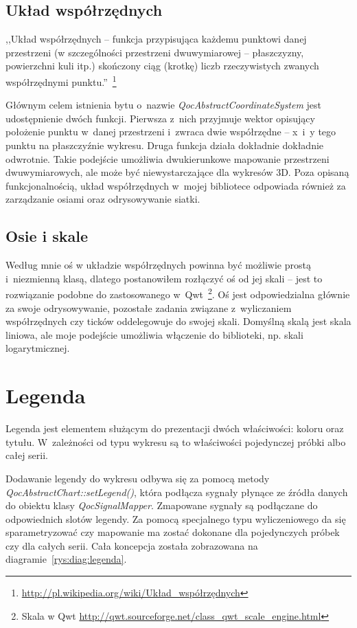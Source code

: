 \subsection{Układ współrzędnych}
,,Układ współrzędnych -- funkcja przypisująca każdemu punktowi danej przestrzeni (w szczególności przestrzeni dwuwymiarowej -- płaszczyzny, powierzchni kuli itp.) skończony ciąg (krotkę) liczb rzeczywistych zwanych współrzędnymi punktu.''~\footnote{\url{http://pl.wikipedia.org/wiki/Układ\_współrzędnych}}

Głównym celem istnienia bytu o~nazwie \textit{QocAbstractCoordinateSystem} jest udostępnienie dwóch funkcji. Pierwsza z~nich przyjmuje wektor opisujący położenie punktu w~danej przestrzeni i~zwraca dwie współrzędne -- x~i~y tego punktu na płaszczyźnie wykresu. Druga funkcja działa dokładnie dokładnie odwrotnie. Takie podejście umożliwia dwukierunkowe mapowanie przestrzeni dwuwymiarowych, ale może być niewystarczające dla wykresów 3D. Poza opisaną funkcjonalnością, układ współrzędnych w~mojej bibliotece odpowiada również za zarządzanie osiami oraz odrysowywanie siatki.

\subsection{Osie i skale} 
Według mnie oś w układzie współrzędnych powinna być możliwie prostą i~niezmienną klasą, dlatego postanowiłem rozłączyć oś od jej skali -- jest to rozwiązanie podobne do zastosowanego w~Qwt~\footnote{Skala w Qwt \url{http://qwt.sourceforge.net/class\_qwt\_scale\_engine.html}}. Oś jest odpowiedzialna głównie za swoje odrysowywanie, pozostałe zadania związane z~wyliczaniem współrzędnych czy ticków oddelegowuje do swojej skali. Domyślną skalą jest skala liniowa, ale moje podejście umożliwia włączenie do biblioteki, np. skali logarytmicznej.

\section{Legenda}
Legenda jest elementem służącym do prezentacji dwóch właściwości: koloru oraz tytułu. W~zależności od typu wykresu są to właściwości pojedynczej próbki albo całej serii. 

Dodawanie legendy do wykresu odbywa się za pomocą metody \textit{QocAbstractChart::setLegend()}, która podłącza sygnały płynące ze źródła danych do obiektu klasy \textit{QocSignalMapper}. Zmapowane sygnały są podłączane do odpowiednich slotów legendy. Za pomocą specjalnego typu wyliczeniowego da się sparametryzować czy mapowanie ma zostać dokonane dla pojedynczych próbek czy dla całych serii. Cała koncepcja została zobrazowana na diagramie~\ref{rys:diag:legenda}.

